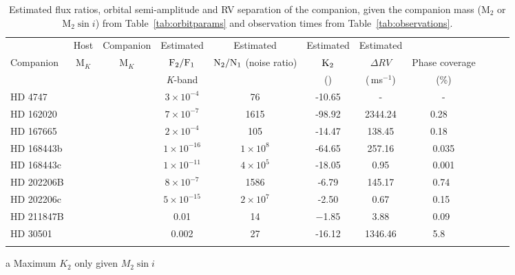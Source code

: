 \begin{table*}
        \small
        \centering
        \caption{Estimated flux ratios, orbital semi-amplitude and RV separation of the companion, given the companion mass (\(\textrm{M}_{2}\) or \(\textrm{M}_{2} \sin{i}\)) from Table~\ref{tab:orbitparams} and observation times from Table~\ref{tab:observations}.} 
        \begin{tabular}{l | c c c c c c c | c c c}%
            \toprule
            & Host& Companion &  Estimated  & Estimated &  Estimated & Estimated &  &    \\  %
            Companion     & M$_{K}$& M$_{K}$& \(\rm F_{2}/F_{1} \)   & \(\rm N_{2}/N_{1} \) (noise ratio) & \(\rm K_2\) &   \(\Delta RV\) & Phase coverage \\
            & & & \textit{K}-band     & & (\kmps{}) & (\,ms\(^{-1}\)) & (\%) \\
            \midrule
            {HD 4747}        & & & \(3\times10^{-4} \)   & 76 &  -10.65 & -  &  -  \\  %
            {HD 162020}   & & & \(7\times10^{-7} \)   & 1615  &  -98.92\tnote{a} &  2344.24     & 0.28~~  \\  %
            {HD 167665}    & & & \(2\times10^{-4} \)   &  105    &  -14.47\tnote{a}  &   138.45     & 0.18~~  \\  %
            {HD 168443b} & & & \(1\times10^{-16} \)  &    \(1\times10^{8} \)   &  -64.65\tnote{a}&   257.16   & 0.035 \\ 
            {HD 168443c} & & &  \(1\times10^{-11} \)  &   \(4\times10^{5} \)     &  -18.05\tnote{a}  &   0.95   &  0.001 \\  %
            {HD 202206}B  & & & \(8\times10^{-7} \)  &   1586 &  -6.79 & 145.17   & 0.74~  \\  %
            {HD 202206}c  & & &  \(5\times10^{-15}\)   &     \(2\times10^{7} \) &   -2.50     &   0.67     &  0.15~  \\  %
            {HD 211847}B  & & &  0.01 &  14   & $-$1.85 & 3.88   & 0.09~  \\  %
            {HD 30501}      & & &  0.002  &  27  &  -16.12    &  1346.46      & 5.8~~  \\
            \bottomrule& & 
            \end{tabular}
    \begin{tablenotes}
        \item[a] {Maximum \(K_2\) only given \(M_2 \sin{i}\)}
      \end{tablenotes}
    \label{tab:estimatedparameters}
\end{table*}